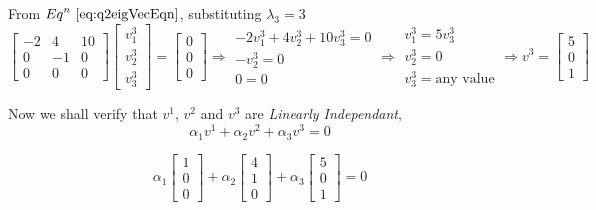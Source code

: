 \documentclass[a4paper]{article}
\begin{document}
\begin{qalist}
			From ${Eq}^{n}~\ref{eq:q2eigVecEqn}$, substituting ${\lambda}_{3} = 3$
			\begin{equation}
				\begin{bmatrix}-2 & 4 & 10 \\ 0 & -1 & 0 \\ 0 & 0 & 0\end{bmatrix} 
				\begin{bmatrix}{v}^{3}_{1} \\ {v}^{3}_{2} \\ {v}^{3}_{3}\end{bmatrix} = 
				\begin{bmatrix}0 \\ 0 \\ 0\end{bmatrix}
				\Rightarrow
				\begin{array}{c}
					-2{v}^{3}_{1} + 4{v}^{3}_{2} + 10{v}^{3}_{3} = 0 \\
					-{v}^{3}_{2} = 0 \\
					0 = 0
				\end{array}
				\Rightarrow \begin{array}{c}{v}^{3}_{1} = 5{v}^{3}_{3} \\ {v}^{3}_{2}=0\\ {v}^{3}_{3}=\text{any value}\end{array} \Rightarrow {v}^{3} = \begin{bmatrix}5 \\ 0 \\ 1\end{bmatrix}
			\end{equation}
			
			Now we shall verify that ${v}^{1}$, ${v}^{2}$ and ${v}^{3}$ are \textit{Linearly Independant},
			\begin{equation}
				{\alpha}_{1}{v}^{1}+{\alpha}_{2}{v}^{2}+{\alpha}_{3}{v}^{3} = 0
			\end{equation}
			
			\begin{equation}
				{\alpha}_{1}\begin{bmatrix}1 \\ 0 \\ 0\end{bmatrix}+
				{\alpha}_{2}\begin{bmatrix}4 \\ 1 \\ 0\end{bmatrix}+
				{\alpha}_{3}\begin{bmatrix}5 \\ 0 \\ 1\end{bmatrix}
				= 0
			\end{equation}
			

\end{qalist}
\end{document}
